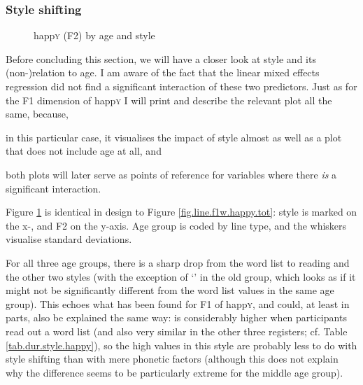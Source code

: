 \subsubsection{Style shifting}
\label{sec.prod.res.vow.happy.f2.shifting}

\begin{figure}[h!]
	\centering
		\resizebox{.5\linewidth}{!}{} 
	\caption{happ\textsc{y} (F2) by age and style}
	\label{fig.line.f2w.happy.tot}
\end{figure}

Before concluding this section, we will have a closer look at style and its (non-)relation to age.
I am aware of the fact that the linear mixed effects regression did not find a significant interaction of these two predictors.
Just as for the F1 dimension of happ\textsc{y} I will print and describe the relevant plot all the same, because,
\begin{inparaenum}[(a)]
	\item in this particular case, it visualises the impact of style almost as well as a plot that does not include age at all, and
	\item both plots will later serve as points of reference for variables where there \emph{is} a significant interaction.
\end{inparaenum}
Figure \ref{fig.line.f2w.happy.tot} is identical in design to Figure \ref{fig.line.f1w.happy.tot}: style is marked on the x-, and F2 on the y-axis.
Age group is coded by line type, and the whiskers visualise standard deviations.

For all three age groups, there is a sharp drop from the word list to reading and the other two styles (with the exception of `' in the old group, which looks as if it might not be significantly different from the word list values in the same age group).
This echoes what has been found for F1 of happ\textsc{y}, and could, at least in parts, also be explained the same way:  is considerably higher when participants read out a word list (and also very similar in the other three registers; cf. Table \ref{tab.dur.style.happy}), so the high values in this style are probably less to do with style shifting than with mere phonetic factors (although this does not explain why the difference seems to be particularly extreme for the middle age group).

